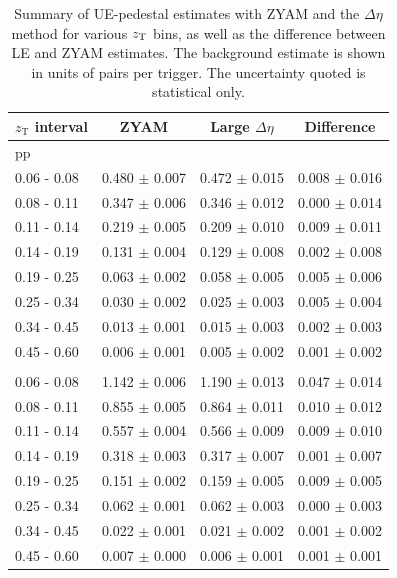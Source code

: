 \begin{table}
   \centering
      \caption{Summary of UE-pedestal estimates with ZYAM and the $\Delta\eta$ method for various $z_{\mathrm{T}}$ bins, as well as the difference between LE and ZYAM estimates. The background estimate is shown in units of pairs per trigger. The uncertainty quoted is statistical only.}
   \begin{tabular*}{1.0\columnwidth}{@{\extracolsep{\fill}}lccc@{}}
    \hline
		$z_\mathrm{T}$ interval & ZYAM  & Large $\Delta\eta$ & Difference\\
		\hline
		pp & & \\
		\hline
0.06 - 0.08 & 0.480 $\pm$ 0.007 & 0.472 $\pm$ 0.015 & 0.008 $\pm$ 0.016\\
0.08 - 0.11 & 0.347 $\pm$ 0.006 & 0.346 $\pm$ 0.012 & 0.000 $\pm$ 0.014\\
0.11 - 0.14 & 0.219 $\pm$ 0.005 & 0.209 $\pm$ 0.010 & 0.009 $\pm$ 0.011\\
0.14 - 0.19 & 0.131 $\pm$ 0.004 & 0.129 $\pm$ 0.008 & 0.002 $\pm$ 0.008\\
0.19 - 0.25 & 0.063 $\pm$ 0.002 & 0.058 $\pm$ 0.005 & 0.005 $\pm$ 0.006\\
0.25 - 0.34 & 0.030 $\pm$ 0.002 & 0.025 $\pm$ 0.003 & 0.005 $\pm$ 0.004\\
0.34 - 0.45 & 0.013 $\pm$ 0.001 & 0.015 $\pm$ 0.003 & 0.002 $\pm$ 0.003\\
0.45 - 0.60 & 0.006 $\pm$ 0.001 & 0.005 $\pm$ 0.002 & 0.001 $\pm$ 0.002\\
	\hline 
	\pPb & & \\
	\hline
0.06 - 0.08 & 1.142 $\pm$ 0.006 & 1.190 $\pm$ 0.013 & 0.047 $\pm$ 0.014\\
0.08 - 0.11 & 0.855 $\pm$ 0.005 & 0.864 $\pm$ 0.011 & 0.010 $\pm$ 0.012\\
0.11 - 0.14 & 0.557 $\pm$ 0.004 & 0.566 $\pm$ 0.009 & 0.009 $\pm$ 0.010\\
0.14 - 0.19 & 0.318 $\pm$ 0.003 & 0.317 $\pm$ 0.007 & 0.001 $\pm$ 0.007\\
0.19 - 0.25 & 0.151 $\pm$ 0.002 & 0.159 $\pm$ 0.005 & 0.009 $\pm$ 0.005\\
0.25 - 0.34 & 0.062 $\pm$ 0.001 & 0.062 $\pm$ 0.003 & 0.000 $\pm$ 0.003\\
0.34 - 0.45 & 0.022 $\pm$ 0.001 & 0.021 $\pm$ 0.002 & 0.001 $\pm$ 0.002\\
0.45 - 0.60 & 0.007 $\pm$ 0.000 & 0.006 $\pm$ 0.001 & 0.001 $\pm$ 0.001\\

   \end{tabular*}
   \label{tab:UE_Average}
\end{table}

